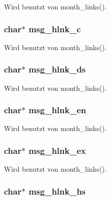 Wird benutzt von month\_\-links().
\subsubsection{\setlength{\rightskip}{0pt plus 5cm}char$\ast$ {\bf msg\_\-hlnk\_\-c}}\label{lang_8h_db006844c6196bd298ae047e146032c6}




Wird benutzt von month\_\-links().
\subsubsection{\setlength{\rightskip}{0pt plus 5cm}char$\ast$ {\bf msg\_\-hlnk\_\-ds}}\label{lang_8h_f477d45ee4c0a42dd8e2badd00583eb3}




Wird benutzt von month\_\-links().
\subsubsection{\setlength{\rightskip}{0pt plus 5cm}char$\ast$ {\bf msg\_\-hlnk\_\-en}}\label{lang_8h_cfa5f6db28bff540ecfe2ee1f05323c2}




Wird benutzt von month\_\-links().
\subsubsection{\setlength{\rightskip}{0pt plus 5cm}char$\ast$ {\bf msg\_\-hlnk\_\-ex}}\label{lang_8h_295cbfa997b35a310627cd5efd8e6634}




Wird benutzt von month\_\-links().
\subsubsection{\setlength{\rightskip}{0pt plus 5cm}char$\ast$ {\bf msg\_\-hlnk\_\-hs}}\label{lang_8h_eae96628c726d260b32e2d22d1d37960}




